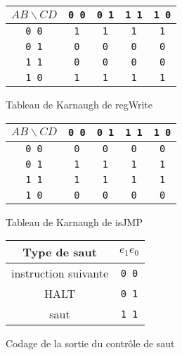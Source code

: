 \documentclass[10pt,a4paper]{article}
\begin{document}
\begin{figure}[h]
\centering
\begin{tabular}{|c|c|c|c|c|}
 \hline
 \textbf{$A B \backslash C D$} & \verb|0 0| & \verb|0 1| & \verb|1 1| & \verb|1 0|\\
 \hline
  \verb|0 0| & \verb|1| & \verb|1| & \verb|1| & \verb|1| \\
 \hline
   \verb|0 1| & \verb|0| & \verb|0| & \verb|0| & \verb|0| \\
 \hline
   \verb|1 1| & \verb|0| & \verb|0| & \verb|0| & \verb|0| \\
 \hline
   \verb|1 0| & \verb|1| & \verb|1| & \verb|1| & \verb|1| \\
 \hline
\end{tabular}
\caption{Tableau de Karnaugh de regWrite}
\label{karnaugh_regwrite}
\end{figure}

\begin{figure}[h]
\centering
\begin{tabular}{|c|c|c|c|c|}
 \hline
 \textbf{$A B \backslash C D$} & \verb|0 0| & \verb|0 1| & \verb|1 1| & \verb|1 0|\\
 \hline
  \verb|0 0| & \verb|0| & \verb|0| & \verb|0| & \verb|0| \\
 \hline
   \verb|0 1| & \verb|1| & \verb|1| & \verb|1| & \verb|1| \\
 \hline
   \verb|1 1| & \verb|1| & \verb|1| & \verb|1| & \verb|1| \\
 \hline
   \verb|1 0| & \verb|0| & \verb|0| & \verb|0| & \verb|0| \\
 \hline
\end{tabular}
\caption{Tableau de Karnaugh de isJMP}
\label{karnaugh_isjmp}
\end{figure}

\begin{figure}[h]
\centering
\begin{tabular}{|c|c|}
 \hline
 \textbf{Type de saut} & \textbf{$e_1 e_0$} \\
 \hline
 instruction suivante & \verb|0 0| \\
 \hline
  HALT & \verb|0 1| \\
 \hline
  saut & \verb|1 1| \\
 \hline
\end{tabular}
\caption{Codage de la sortie du contrôle de saut}
\label{code_sortie_controle}
\end{figure}
\end{document}
